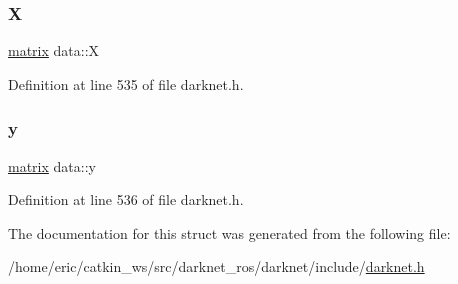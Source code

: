\subsubsection{\texorpdfstring{X}{X}}
{\footnotesize\ttfamily \mbox{\hyperlink{structmatrix}{matrix}} data\+::X}



Definition at line 535 of file darknet.\+h.

\mbox{\label{structdata_a30946bde3a05e40df6fbb49c5dd9b627}} 
\subsubsection{\texorpdfstring{y}{y}}
{\footnotesize\ttfamily \mbox{\hyperlink{structmatrix}{matrix}} data\+::y}



Definition at line 536 of file darknet.\+h.



The documentation for this struct was generated from the following file\+:\begin{DoxyCompactItemize}
\item 
/home/eric/catkin\+\_\+ws/src/darknet\+\_\+ros/darknet/include/\mbox{\hyperlink{darknet_8h}{darknet.\+h}}\end{DoxyCompactItemize}
